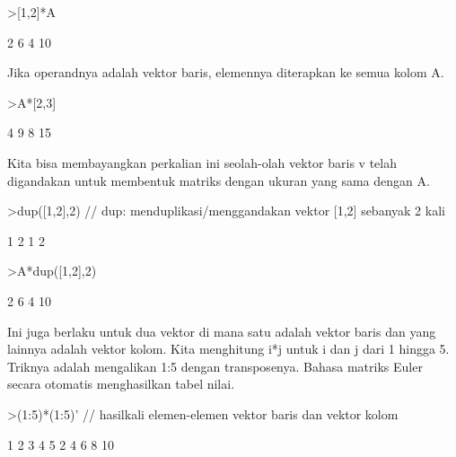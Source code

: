 \documentclass[a4paper,10pt]{article}
\begin{document}
\begin{eulernotebook}
\begin{eulercomment}
\begin{eulercomment}
\begin{eulercomment}
\begin{eulercomment}
\begin{eulercomment}
\begin{eulercomment}
\begin{eulercomment}
\begin{eulercomment}
\begin{eulercomment}
\begin{eulercomment}
\begin{eulercomment}
\begin{eulercomment}
\begin{eulercomment}
\begin{eulercomment}
\begin{eulercomment}
\begin{eulercomment}
\begin{eulercomment}
\end{eulercomment}
\begin{eulerprompt}
>[1,2]*A
\end{eulerprompt}
\begin{euleroutput}
              2             6 
              4            10 
\end{euleroutput}
\begin{eulercomment}
Jika operandnya adalah vektor baris, elemennya diterapkan ke semua
kolom A.
\end{eulercomment}
\begin{eulerprompt}
>A*[2,3]
\end{eulerprompt}
\begin{euleroutput}
              4             9 
              8            15 
\end{euleroutput}
\begin{eulercomment}
Kita bisa membayangkan perkalian ini seolah-olah vektor baris v telah
digandakan untuk membentuk matriks dengan ukuran yang sama dengan A.
\end{eulercomment}
\begin{eulerprompt}
>dup([1,2],2) // dup: menduplikasi/menggandakan vektor [1,2] sebanyak 2 kali
\end{eulerprompt}
\begin{euleroutput}
              1             2 
              1             2 
\end{euleroutput}
\begin{eulerprompt}
>A*dup([1,2],2)
\end{eulerprompt}
\begin{euleroutput}
              2             6 
              4            10 
\end{euleroutput}
\begin{eulercomment}
Ini juga berlaku untuk dua vektor di mana satu adalah vektor baris dan
yang lainnya adalah vektor kolom. Kita menghitung i*j untuk i dan j
dari 1 hingga 5. Triknya adalah mengalikan 1:5 dengan transposenya.
Bahasa matriks Euler secara otomatis menghasilkan tabel nilai.
\end{eulercomment}
\begin{eulerprompt}
>(1:5)*(1:5)' // hasilkali elemen-elemen vektor baris dan vektor kolom
\end{eulerprompt}
\begin{euleroutput}
              1             2             3             4             5 
              2             4             6             8            10 

\end{euleroutput}
\end{eulercomment}
\end{eulercomment}
\end{eulercomment}
\end{eulercomment}
\end{eulercomment}
\end{eulercomment}
\end{eulercomment}
\end{eulercomment}
\end{eulercomment}
\end{eulercomment}
\end{eulercomment}
\end{eulercomment}
\end{eulercomment}
\end{eulercomment}
\end{eulercomment}
\end{eulercomment}
\end{eulernotebook}
\end{document}
